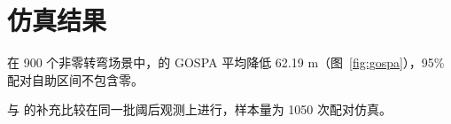 \section{仿真结果}
在 900 个非零转弯场景中，\method 的 GOSPA 平均降低 62.19 m（图~\ref{fig:gospa}），95\% 配对自助区间不包含零。

与 \gtmethod 的补充比较在同一批阈后观测上进行，样本量为 1050 次配对仿真。
